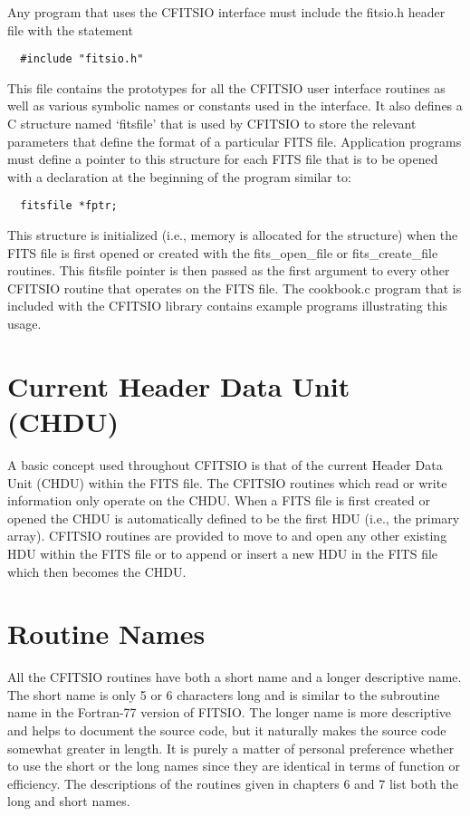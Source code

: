 Any program that uses the CFITSIO interface must include the fitsio.h
header file with the statement

\begin{verbatim}
  #include "fitsio.h"
\end{verbatim}
This file contains the prototypes for
all the CFITSIO user interface routines as well as various symbolic
names or constants used in the interface.  It also defines a C
structure named `fitsfile' that is used by CFITSIO to store the
relevant parameters that define the format of a particular FITS file.
Application programs must define a pointer to this structure for each
FITS file that is to be opened with a declaration
at the beginning of the program similar to:

\begin{verbatim}
  fitsfile *fptr;
\end{verbatim}
This structure is initialized (i.e., memory is allocated
for the structure) when the FITS file is first opened or created
with the fits\_open\_file or fits\_create\_file routines.  This fitsfile
pointer is then passed as the first argument to every other CFITSIO
routine that operates on the FITS file.  The cookbook.c program
that is included with the CFITSIO library contains example programs
illustrating this usage.


\section{Current Header Data Unit (CHDU)}

A basic concept used throughout CFITSIO is that of the current Header
Data Unit (CHDU) within the FITS file. The CFITSIO routines which read
or write information only operate on the CHDU.  When a FITS file is first
created or opened the CHDU is automatically defined to be the first HDU
(i.e., the primary array).  CFITSIO routines are provided to move
to and open any other existing HDU within the FITS file or to append or
insert a new HDU in the FITS file which then becomes the CHDU.


\section{Routine Names}

All the CFITSIO routines have both a short name and a longer
descriptive name.  The short name is only 5 or 6 characters long and is
similar to the subroutine name in the Fortran-77 version of FITSIO.
The longer name is more descriptive and helps to document the source
code, but it naturally makes the source code somewhat greater in
length.  It is purely a matter of personal preference whether to use
the short or the long names since they are identical in terms of
function or efficiency.  The descriptions of the routines given in
chapters 6 and 7 list both the long and short names.


